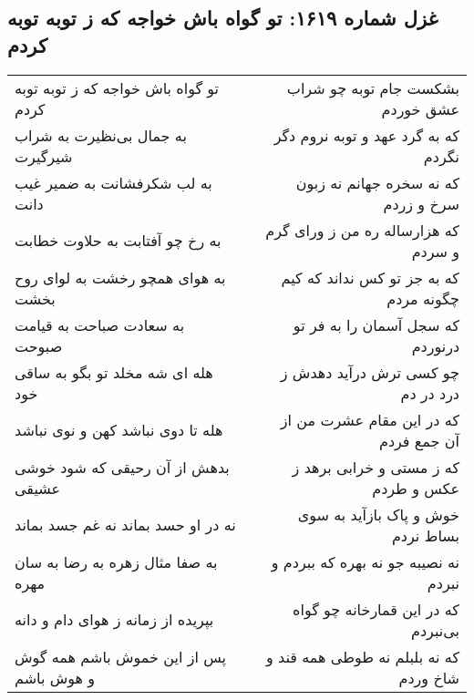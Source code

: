 \begin{center}
\section*{غزل شماره ۱۶۱۹: تو گواه باش خواجه که ز توبه توبه کردم}
\label{sec:1619}
\begin{longtable}{l p{0.5cm} r}
تو گواه باش خواجه که ز توبه توبه کردم
&&
بشکست جام توبه چو شراب عشق خوردم
\\
به جمال بی‌نظیرت به شراب شیرگیرت
&&
که به گرد عهد و توبه نروم دگر نگردم
\\
به لب شکرفشانت به ضمیر غیب دانت
&&
که نه سخره جهانم نه زبون سرخ و زردم
\\
به رخ چو آفتابت به حلاوت خطابت
&&
که هزارساله ره من ز ورای گرم و سردم
\\
به هوای همچو رخشت به لوای روح بخشت
&&
که به جز تو کس نداند که کیم چگونه مردم
\\
به سعادت صباحت به قیامت صبوحت
&&
که سجل آسمان را به فر تو درنوردم
\\
هله ای شه مخلد تو بگو به ساقی خود
&&
چو کسی ترش درآید دهدش ز درد در دم
\\
هله تا دوی نباشد کهن و نوی نباشد
&&
که در این مقام عشرت من از آن جمع فردم
\\
بدهش از آن رحیقی که شود خوشی عشیقی
&&
که ز مستی و خرابی برهد ز عکس و طردم
\\
نه در او حسد بماند نه غم جسد بماند
&&
خوش و پاک بازآید به سوی بساط نردم
\\
به صفا مثال زهره به رضا به سان مهره
&&
نه نصیبه جو نه بهره که ببردم و نبردم
\\
بپریده از زمانه ز هوای دام و دانه
&&
که در این قمارخانه چو گواه بی‌نبردم
\\
پس از این خموش باشم همه گوش و هوش باشم
&&
که نه بلبلم نه طوطی همه قند و شاخ وردم
\\
\end{longtable}
\end{center}
